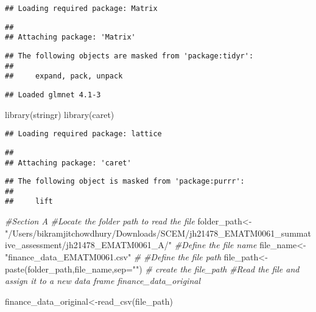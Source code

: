 \documentclass[
]{article}
\newenvironment{Shaded}{\begin{snugshade}}{\end{snugshade}}
\newcommand{\AttributeTok}[1]{\textcolor[rgb]{0.77,0.63,0.00}{#1}}
\newcommand{\CommentTok}[1]{\textcolor[rgb]{0.56,0.35,0.01}{\textit{#1}}}
\newcommand{\FunctionTok}[1]{\textcolor[rgb]{0.00,0.00,0.00}{#1}}
\newcommand{\NormalTok}[1]{#1}
\newcommand{\OtherTok}[1]{\textcolor[rgb]{0.56,0.35,0.01}{#1}}
\newcommand{\StringTok}[1]{\textcolor[rgb]{0.31,0.60,0.02}{#1}}
\begin{document}
\begin{verbatim}
## Loading required package: Matrix
\end{verbatim}

\begin{verbatim}
## 
## Attaching package: 'Matrix'
\end{verbatim}

\begin{verbatim}
## The following objects are masked from 'package:tidyr':
## 
##     expand, pack, unpack
\end{verbatim}

\begin{verbatim}
## Loaded glmnet 4.1-3
\end{verbatim}

\begin{Shaded}
\begin{Highlighting}[]
\FunctionTok{library}\NormalTok{(stringr)}
\FunctionTok{library}\NormalTok{(caret)}
\end{Highlighting}
\end{Shaded}

\begin{verbatim}
## Loading required package: lattice
\end{verbatim}

\begin{verbatim}
## 
## Attaching package: 'caret'
\end{verbatim}

\begin{verbatim}
## The following object is masked from 'package:purrr':
## 
##     lift
\end{verbatim}

\begin{Shaded}
\begin{Highlighting}[]
\CommentTok{\#Section A}
\CommentTok{\#Locate the folder path to read the file}
\NormalTok{folder\_path}\OtherTok{\textless{}{-}}\StringTok{"/Users/bikramjitchowdhury/Downloads/SCEM/jh21478\_EMATM0061\_summative\_assessment/jh21478\_EMATM0061\_A/"}
\CommentTok{\#Define the file name}
\NormalTok{file\_name}\OtherTok{\textless{}{-}}\StringTok{"finance\_data\_EMATM0061.csv"} \CommentTok{\#}
\CommentTok{\#Define the file path}
\NormalTok{file\_path}\OtherTok{\textless{}{-}}\FunctionTok{paste}\NormalTok{(folder\_path,file\_name,}\AttributeTok{sep=}\StringTok{""}\NormalTok{) }\CommentTok{\# create the file\_path}
\CommentTok{\#Read the file and assign it to a new data frame finance\_data\_original }

\NormalTok{finance\_data\_original}\OtherTok{\textless{}{-}}\FunctionTok{read\_csv}\NormalTok{(file\_path) }
\end{Highlighting}
\end{Shaded}
\end{document}
